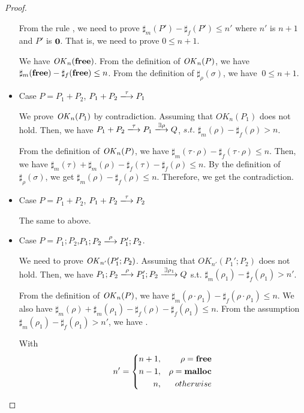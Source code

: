 \begin{proof}
\begin{itemize}
From the rule , we need to prove \(\sharp_{m}(P') -
\sharp_{f}(P') \le n'\) where \(n'\) is \(n + 1\) and \(P'\) is \(\bf
0\). That is, we need to prove \( 0 \le n + 1\).

We have \(\mathit{OK}_{n}(\mathbf{free})\). From the definition of \(\mathit{OK}_n(P)\), we
have \(\sharp_{m}(\mathbf{free}) - \sharp_{f}(\mathbf{free}) \le n\). From the
definition of \(\sharp_{\rho}(\sigma)\), we have \( \ 0 \le n+1\).

\item Case $P = P_{1} + P_{2}$, \Rtab \(P_1 + P_2 \xlongrightarrow{\tau} P_1\)

  We prove \(\mathit{OK}_n(P_1)\) by contradiction.  Assuming that
  \(OK_{n}(P_1)\) does not hold.  Then, we have \(P_{1} + P_{2}
  \xlongrightarrow{\tau} P_{1} \xlongrightarrow{\exists \rho} Q\),
  \(s.t.\) \(\sharp_{m}(\rho) - \sharp_{f}(\rho) > n\).

  From the definition of \(\mathit{OK}_n(P)\),
  we have \(\sharp_m(\tau \cdot \rho) -\sharp_f(\tau \cdot \rho) \le
  n\). Then, we have \(\sharp_m(\tau) + \sharp_m(\rho) -
  \sharp_f(\tau) -\sharp_f(\rho) \le n\).  By the definition of
  \(\sharp_\rho(\sigma)\),  we get \(\sharp_m(\rho) -\sharp_f(\rho)
  \le n\). Therefore, we get the contradiction.

\item Case $P = P_{1} + P_{2}$, \Rtab \(P_1 + P_2 \xlongrightarrow{\tau} P_2\)

 The same to above.

\item Case $P = P_{1};P_{2}$,\Rtab \(P_1;P_2 \xlongrightarrow{\rho} P_1';P_2\).


  We need to prove \(\mathit{OK}_{n'}(P_1';P_2)\).  Assuming that
  \(OK_{n'}(P_{1}';P_{2})\) does not hold. Then, we have \(P_{1};P_{2}
  \xlongrightarrow{\rho} P_{1}';P_{2} \xlongrightarrow{\exists \rho_1}
  Q\) s.t. \(\sharp_{m}(\rho_1) - \sharp_{f}(\rho_1) > n'\).

  From the definition of \(\mathit{OK}_n(P)\), we have \( \sharp_{m}(\rho
  \cdot \rho_1) - \sharp_{f}(\rho \cdot \rho_1) \le n\).  We also have
  \(\sharp_{m}(\rho) + \sharp_{m}(\rho_1) - \sharp_{f}(\rho)
  -\sharp_{f}(\rho_1) \le n\).  From the assumption
  \(\sharp_{m}(\rho_1) - \sharp_{f}(\rho_1) > n'\), we have .

With
$$
   n'=\left\{
   \begin{aligned}
     n + 1, && \rho = \mathbf{free} \\
     n - 1,  && \rho = \mathbf{malloc}  \\
     n ,      && otherwise
   \end{aligned}
   \right.
$$


\end{itemize}
\end{proof}
